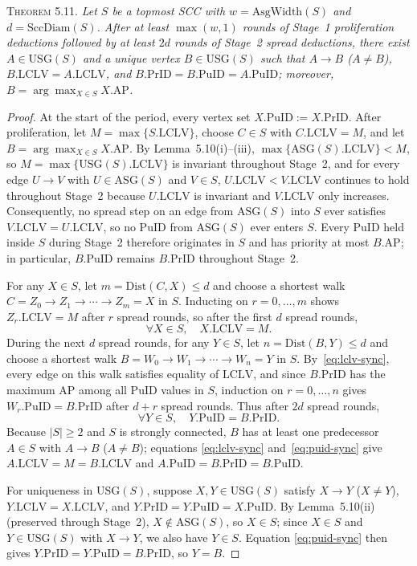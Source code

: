 \documentclass[sigconf,nonacm]{acmart}
\newcommand{\lclv}{\mathrm{LCLV}}
\newcommand{\puid}{\mathrm{PuID}}
\newcommand{\prid}{\mathrm{PrID}}
\newcommand{\ap}{\mathrm{AP}}
\newcommand{\usg}{\mathrm{USG}}
\newcommand{\asg}{\mathrm{ASG}}
\newcommand{\dist}{\mathrm{Dist}}
\newcommand{\asgwidth}{\mathrm{AsgWidth}}
\newcommand{\sccdiam}{\mathrm{SccDiam}}
\newcommand{\phead}[1]{\par\noindent\textsc{#1.}\enspace}
\begin{document}
\phead{Theorem 5.11}%
\emph{Let \(S\) be a topmost SCC with \(w=\asgwidth(S)\) and
\(d=\sccdiam(S)\). After at least \(\max(w,1)\) rounds of Stage~1
proliferation deductions followed by at least \(2d\) rounds of Stage~2
spread deductions, there exist \(A\in\usg(S)\) and a unique vertex
\(B\in\usg(S)\) such that \(A\to B\) (\(A\neq B\)), \(B.\lclv=A.\lclv\),
and \(B.\prid=B.\puid=A.\puid\); moreover,
\(B=\arg\max_{X\in S} X.\ap\).}
\begin{proof}
At the start of the period, every vertex set \(X.\puid:=X.\prid\). After
proliferation, let \(M=\max\{S.\lclv\}\), choose \(C\in S\) with
\(C.\lclv=M\), and let \(B=\arg\max_{X\in S} X.\ap\). By
Lemma~5.10(i)--(iii), \(\max\{\asg(S).\lclv\}<M\), so
\(M=\max\{\usg(S).\lclv\}\) is invariant throughout Stage~2, and for
every edge \(U\to V\) with \(U\in\asg(S)\) and \(V\in S\),
\(U.\lclv<V.\lclv\) continues to hold throughout Stage~2 because
\(U.\lclv\) is invariant and \(V.\lclv\) only increases. Consequently,
no spread step on an edge from \(\asg(S)\) into \(S\) ever satisfies
\(V.\lclv=U.\lclv\), so no \(\puid\) from \(\asg(S)\) ever enters \(S\).
Every \(\puid\) held inside \(S\) during Stage~2 therefore originates in
\(S\) and has priority at most \(B.\ap\); in particular, \(B.\puid\)
remains \(B.\prid\) throughout Stage~2.

For any \(X\in S\), let \(m=\dist(C,X)\le d\) and choose a shortest walk
\(C=Z_0\to Z_1\to\cdots\to Z_m=X\) in \(S\). Inducting on \(r=0,\dots,m\)
shows \(Z_r.\lclv=M\) after \(r\) spread rounds, so after the first
\(d\) spread rounds,
\begin{equation}\label{eq:lclv-sync}
  \forall X\in S,\quad X.\lclv = M.
\end{equation}
During the next \(d\) spread rounds, for any \(Y\in S\), let
\(n=\dist(B,Y)\le d\) and choose a shortest walk
\(B=W_0\to W_1\to\cdots\to W_n=Y\) in \(S\). By~\eqref{eq:lclv-sync},
every edge on this walk satisfies equality of \(\lclv\), and since
\(B.\prid\) has the maximum \(\ap\) among all \(\puid\) values in \(S\),
induction on \(r=0,\dots,n\) gives \(W_r.\puid=B.\prid\) after \(d+r\)
spread rounds. Thus after \(2d\) spread rounds,
\begin{equation}\label{eq:puid-sync}
  \forall Y\in S,\quad Y.\puid = B.\prid.
\end{equation}
Because \(|S|\ge 2\) and \(S\) is strongly connected, \(B\) has at least
one predecessor \(A\in S\) with \(A\to B\) (\(A\neq B\)); equations
\eqref{eq:lclv-sync} and~\eqref{eq:puid-sync} give
\(A.\lclv=M=B.\lclv\) and \(A.\puid=B.\prid=B.\puid\).

For uniqueness in \(\usg(S)\), suppose \(X,Y\in\usg(S)\) satisfy
\(X\to Y\) (\(X\neq Y\)), \(Y.\lclv=X.\lclv\), and
\(Y.\prid=Y.\puid=X.\puid\). By Lemma~5.10(ii) (preserved through
Stage~2), \(X\notin\asg(S)\), so \(X\in S\); since \(X\in S\) and
\(Y\in\usg(S)\) with \(X\to Y\), we also have \(Y\in S\). Equation
\eqref{eq:puid-sync} then gives \(Y.\prid=Y.\puid=B.\prid\), so \(Y=B\).
\end{proof}
\end{document}
